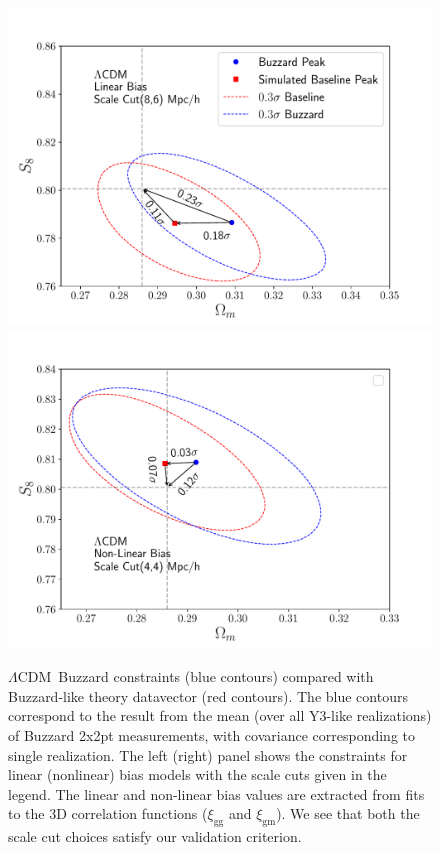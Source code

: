 \documentclass[fleqn,usenatbib]{mnras}
\newcommand{\xigg}{\ensuremath{\xi_{\mathrm{gg}}} }
\newcommand{\xigm}{\ensuremath{\xi_{\mathrm{gm}}} }
\newcommand{\lcdm}{$\Lambda$CDM}
\begin{document}
\begin{figure}
\includegraphics[width=\columnwidth]{figs/linear_bias_86_lcdm_Om_S8_buzzard.pdf}
\includegraphics[width=\columnwidth]{figs/non_linear_bias_44_lcdm_Om_S8_buzzard.pdf}
\caption[]{\lcdm\ Buzzard constraints (blue contours) compared with  Buzzard-like theory datavector (red contours). The blue contours correspond to the result from the mean (over all Y3-like realizations) of Buzzard 2x2pt measurements, with covariance corresponding to single realization. The left (right) panel shows the constraints for linear (nonlinear) bias models  with the scale cuts given in the legend. The linear and non-linear bias values are extracted from fits to the 3D correlation functions ($\xigg$ and $\xigm$). We see that both  the scale cut choices satisfy our validation criterion. }
\label{fig:bcc_des_lcdm}
\end{figure}
\end{document}

